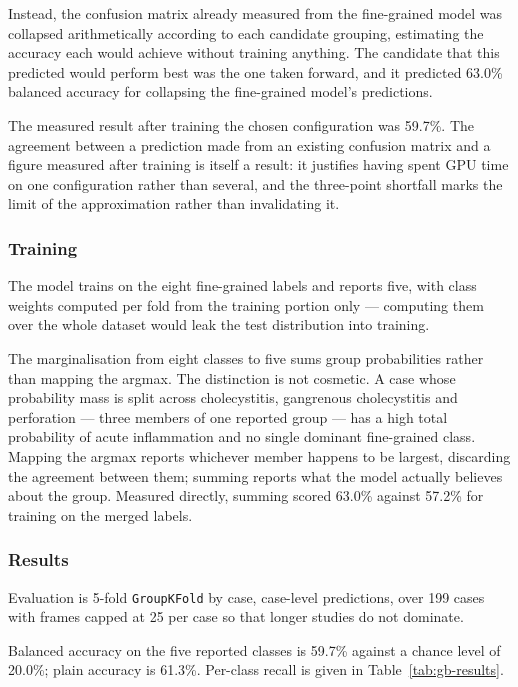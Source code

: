 Instead, the confusion matrix already measured from the fine-grained model was collapsed
arithmetically according to each candidate grouping, estimating the accuracy each would achieve
without training anything. The candidate that this predicted would perform best was the one
taken forward, and it predicted 63.0\% balanced accuracy for collapsing the fine-grained model's
predictions.

The measured result after training the chosen configuration was 59.7\%. The agreement between a
prediction made from an existing confusion matrix and a figure measured after training is itself
a result: it justifies having spent GPU time on one configuration rather than several, and the
three-point shortfall marks the limit of the approximation rather than invalidating it.

\subsubsection{Training}

The model trains on the eight fine-grained labels and reports five, with class weights computed
per fold from the training portion only --- computing them over the whole dataset would leak the
test distribution into training.

The marginalisation from eight classes to five sums group probabilities rather than mapping the
argmax. The distinction is not cosmetic. A case whose probability mass is split across
cholecystitis, gangrenous cholecystitis and perforation --- three members of one reported group
--- has a high total probability of acute inflammation and no single dominant fine-grained class.
Mapping the argmax reports whichever member happens to be largest, discarding the agreement
between them; summing reports what the model actually believes about the group. Measured
directly, summing scored 63.0\% against 57.2\% for training on the merged labels.

\subsubsection{Results}
\label{subsec:gallbladder-results}

Evaluation is 5-fold \texttt{GroupKFold} by case, case-level predictions, over 199 cases with
frames capped at 25 per case so that longer studies do not dominate.

Balanced accuracy on the five reported classes is 59.7\% against a chance level of 20.0\%; plain
accuracy is 61.3\%. Per-class recall is given in Table~\ref{tab:gb-results}.

